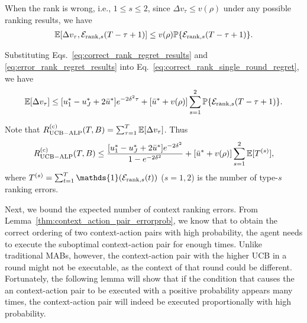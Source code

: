 When the rank is wrong, i.e., $1\leq s \leq 2$, since $\Delta {v}_{\tau} \leq v(\rho)$ under any possible ranking results,  we have
\begin{eqnarray}  \label{eq:error_rank_regret_results}
\mathbb{E}[\Delta {v}_{\tau},  \mathcal{E}_{{\rm rank}, s}(T - \tau + 1)] \leq v(\rho) \mathbb{P}\{\mathcal{E}_{{\rm rank}, s}(T - \tau + 1)\}.
\end{eqnarray}


Substituting Eqs.~\eqref{eq:correct_rank_regret_results} and \eqref{eq:error_rank_regret_results} into Eq.~\eqref{eq:correct_rank_single_round_regret}, we have
\begin{eqnarray}  %
\mathbb{E}[\Delta {v}_{\tau}] \leq  [u_1^* - u_J^* + 2\bar{u}^*] e^{-2\delta^2\tau}
 + [\bar{u}^* + v(\rho)]\sum_{s=1}^2\mathbb{P}\{\mathcal{E}_{{\rm rank}, s}(T - \tau + 1)\}.\nonumber
\end{eqnarray}

Note that $R_{\rm {UCB-ALP}}^{({\rm c})}(T, B) = \sum_{\tau = 1}^T \mathbb{E}[\Delta {v}_{\tau}]$. Thus
\begin{eqnarray} \label{eq:regret_context_ranking_nonboundary}
R_{\rm {UCB-ALP}}^{({\rm c})}(T, B) \leq  \frac{[u_1^* - u_J^*+2\bar{u}^*] e^{-2\delta^2}}{1 - e^{-2\delta^2}}
+ [\bar{u}^* + v(\rho)]\sum_{s=1}^2\mathbb{E}[T^{(s)}],
\end{eqnarray}
where $T^{(s)} = \sum_{t = 1}^T \mathds{1}(\mathcal{E}_{{\rm rank}, s}(t))$ ($s = 1,2$) is the number of type-$s$ ranking errors.

Next, we bound the expected number of context ranking errors. From Lemma~\ref{thm:context_action_pair_errorprob}, we know that to obtain the correct ordering of two context-action pairs with high probability, the agent needs to execute the suboptimal context-action pair for enough times. Unlike traditional MABs, however,  the context-action pair with the higher UCB in a round might not be executable, as the context of that round could be different. Fortunately, the following lemma will show that if the condition that causes the an context-action pair to be executed with a positive probability appears many times,  the  context-action pair will indeed be executed proportionally with high probability.


